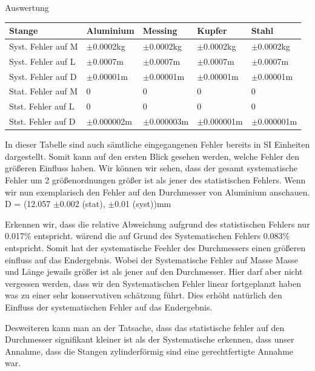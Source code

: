 \documentclass[twoside]{protokoll}
\begin{document}
\begin{aufgabe}{Auswertung}
 \begin{table}[H]
        \centering
        \begin{tabularx}{1\textwidth}{l X X X X} %
            \toprule
            \textbf{Stange} & \textbf{Aluminium} & \textbf{Messing} & \textbf{Kupfer} & \textbf{Stahl} \\
            \midrule
            Syst. Fehler auf M & $\pm$0.0002kg & $\pm$0.0002kg & $\pm$0.0002kg & $\pm$0.0002kg \\
            Syst. Fehler auf L & $\pm$0.0007m & $\pm$0.0007m & $\pm$0.0007m & $\pm$0.0007m \\
            Syst. Fehler auf D & $\pm$0.00001m & $\pm$0.00001m & $\pm$0.00001m & $\pm$0.00001m \\

            \midrule
            Stat. Fehler auf M & 0 & 0 & 0 & 0 \\
            Stst. Fehler auf L & 0 & 0 & 0 & 0 \\
            Stst. Fehler auf D & $\pm$0.000002m & $\pm$0.000003m & $\pm$0.000001m & $\pm$0.000001m \\
           
            \bottomrule
        \end{tabularx}
        \label{tab:mytable}
    \end{table}

In dieser Tabelle sind auch sämtliche eingegangenen Fehler bereits in SI Einheiten dargestellt. Somit kann auf den ersten Blick gesehen werden, welche Fehler den größeren 
Einfluss haben. Wir können wir sehen, dass der gesamt systematische Fehler um 2 größenordnungen größer ist als jener des statistischen Fehlers. Wenn wir nun exemplarisch den Fehler auf den Durchmesser von Aluminium anschauen.
 D = (12.057 $\pm$0.002 (stat), $\pm$0.01 (syst))mm 
 
Erkennen wir, dass die relative Abweichung aufgrund des statistischen 
Fehlers nur 0.017\% entspricht. wärend die auf Grund des Systematischen Fehlers
0.083\% entspricht. Somit hat der systematische Feehler des Durchmessers
einen größeren einfluss auf das Endergebnis. Wobei der Systematische Fehler auf Masse 
Masse und Länge jewails größer ist als jener auf den Durchmesser. 
Hier darf aber nicht vergessen werden, dass wir den Systematischen Fehler linear fortgeplanzt haben was zu einer sehr konservativen schätzung führt. Dies erhöht 
natürlich den Einfluss der systematischen Fehler auf das Endergebnis. 

Desweiteren kann man an der Tatsache, dass das statistische fehler auf den Durchmesser 
signifikant kleiner ist als der Systematische erkennen, dass unser Annahme, 
dass die Stangen zylinderförmig sind eine gerechtfertigte Annahme war. 


\end{aufgabe}
\end{document}
